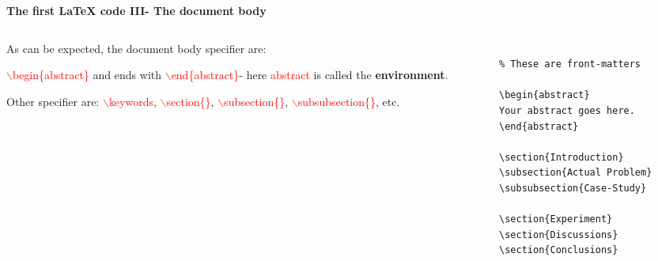 \documentclass[xcolor=dvipsnames]{beamer}
\begin{document}
\begin{frame}[fragile]{\textbf{The first \LaTeX{} code III- The document body}}

\begin{columns}
\begin{column}{0.4\textwidth}

As can be expected, the document body specifier are:\\
  
   \vspace{0.3cm}

\textcolor{red}{$\backslash$begin\{abstract\}} and ends with \textcolor{red}{$\backslash$end\{abstract\}}- here \textcolor{red}{abstract} is called the \textbf{environment}.\\
   \vspace{0.3cm}
   
Other specifier are: \textcolor{red}{$\backslash$keywords}, \textcolor{red}{$\backslash$section\{\}}, \textcolor{red}{$\backslash$subsection\{\}},
\textcolor{red}{$\backslash$subsubsection\{\}}, etc.

\end{column}

\begin{column}{0.5\textwidth}
\small
\begin{Verbatim}[frame=single]

% These are front-matters

\begin{abstract}
Your abstract goes here.
\end{abstract}

\section{Introduction}
\subsection{Actual Problem}
\subsubsection{Case-Study}

\section{Experiment}
\section{Discussions}
\section{Conclusions}

\end{Verbatim}
\end{column}

\end{columns}

\end{frame}
\end{document}
